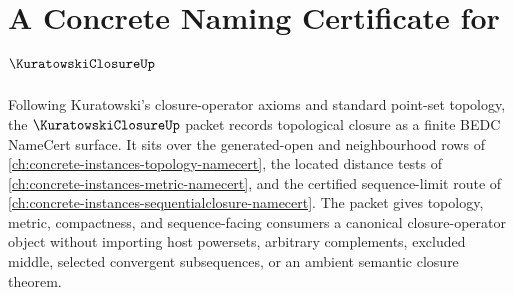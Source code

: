 \chapter{A Concrete Naming Certificate for $\KuratowskiClosureUp$}
\label{ch:concrete-instances-kuratowski-closure-namecert}

Following Kuratowski's closure-operator axioms and standard point-set topology, the $\KuratowskiClosureUp$ packet records topological closure as a finite BEDC NameCert surface. It sits over the generated-open and neighbourhood rows of \autoref{ch:concrete-instances-topology-namecert}, the located distance tests of \autoref{ch:concrete-instances-metric-namecert}, and the certified sequence-limit route of \autoref{ch:concrete-instances-sequentialclosure-namecert}. The packet gives topology, metric, compactness, and sequence-facing consumers a canonical closure-operator object without importing host powersets, arbitrary complements, excluded middle, selected convergent subsequences, or an ambient semantic closure theorem.

